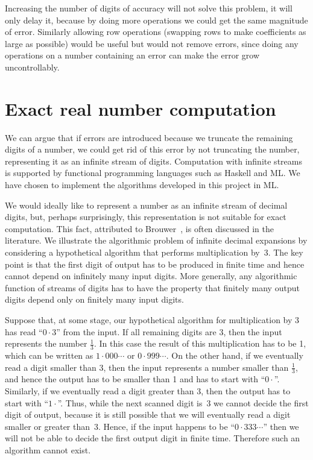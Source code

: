 \documentclass[12pt]{article}
\begin{document}
Increasing the number of digits of accuracy will not solve this
problem, it will only delay it, because by doing more operations we
could get the same magnitude of error.  Similarly allowing row
operations (swapping rows to make coefficients as large as possible)
would be useful but would not remove errors, since doing any
operations on a number containing an error can make the error grow
uncontrollably.

\section{Exact real number computation} \label{sec:stra}

We can argue that if errors are introduced because we truncate the
remaining digits of a number, we could get rid of this error by not
truncating the number, representing it as an infinite stream of
digits. Computation with infinite streams is supported by functional
programming languages such as Haskell and ML. We have chosen to
implement the algorithms developed in this project in ML.

We would ideally like to represent a number as an infinite stream of
decimal digits, but, perhaps surprisingly, this representation is not
suitable for exact computation. This fact, attributed to
Brouwer~\cite{kn:Brouwer}, is often discussed in the literature.  We
illustrate the algorithmic problem of infinite decimal expansions by
considering a hypothetical algorithm that performs multiplication
by~3. The key point is that the first digit of output has to be
produced in finite time and hence cannot depend on infinitely many
input digits.  More generally, any algorithmic function of streams of
digits has to have the property that finitely many output digits
depend only on finitely many input digits.

Suppose that, at some stage, our hypothetical algorithm for
multiplication by 3 has read ``$0 \cdot 3$'' from the input. If all remaining
digits are 3, then the input represents the number $\frac{1}{3}$. In
this case the result of this multiplication has to be 1, which can be
written as $1 \cdot 000\cdots$ or $0 \cdot 999\cdots$.  On the other hand, if we
eventually read a digit smaller than 3, then the input represents a
number smaller than $\frac{1}{3}$, and hence the output has to be
smaller than 1 and has to start with ``$0 \cdot$''. Similarly, if we
eventually read a digit greater than 3, then the output has to start
with ``$1 \cdot$''. Thus, while the next scanned digit is~3 we cannot decide
the first digit of output, because it is still possible that we will
eventually read a digit smaller or greater than~3. Hence, if the input
happens to be ``$0 \cdot 333\cdots$'' then we will not be able to decide the
first output digit in finite time. Therefore such an algorithm cannot
exist.
\end{document}
